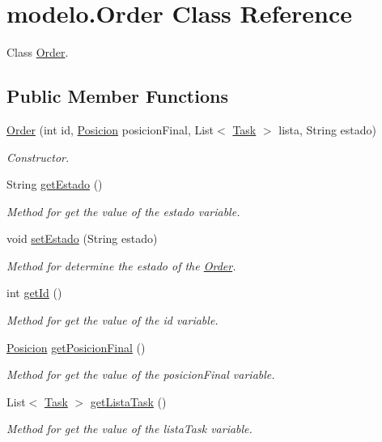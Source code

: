 \hypertarget{classmodelo_1_1_order}{}\section{modelo.\+Order Class Reference}
\label{classmodelo_1_1_order}


Class \mbox{\hyperlink{classmodelo_1_1_order}{Order}}.  


\subsection*{Public Member Functions}
\begin{DoxyCompactItemize}
\item 
\mbox{\hyperlink{classmodelo_1_1_order_a413d8d424a685bc7c454593c55494c51}{Order}} (int id, \mbox{\hyperlink{classmodelo_1_1_posicion}{Posicion}} posicion\+Final, List$<$ \mbox{\hyperlink{classmodelo_1_1_task}{Task}} $>$ lista, String estado)
\begin{DoxyCompactList}\small\item\em Constructor. \end{DoxyCompactList}\item 
String \mbox{\hyperlink{classmodelo_1_1_order_a022a04a9662463356a74e95b723d16fc}{get\+Estado}} ()
\begin{DoxyCompactList}\small\item\em Method for get the value of the estado variable. \end{DoxyCompactList}\item 
void \mbox{\hyperlink{classmodelo_1_1_order_ae01e30a69b5efd08f428f08a75756ca6}{set\+Estado}} (String estado)
\begin{DoxyCompactList}\small\item\em Method for determine the estado of the \mbox{\hyperlink{classmodelo_1_1_order}{Order}}. \end{DoxyCompactList}\item 
int \mbox{\hyperlink{classmodelo_1_1_order_a6eed9b98ef4db951d02fe77f8f1430b1}{get\+Id}} ()
\begin{DoxyCompactList}\small\item\em Method for get the value of the id variable. \end{DoxyCompactList}\item 
\mbox{\hyperlink{classmodelo_1_1_posicion}{Posicion}} \mbox{\hyperlink{classmodelo_1_1_order_a65b8d00aa11928a30bbe069540bb182f}{get\+Posicion\+Final}} ()
\begin{DoxyCompactList}\small\item\em Method for get the value of the posicion\+Final variable. \end{DoxyCompactList}\item 
List$<$ \mbox{\hyperlink{classmodelo_1_1_task}{Task}} $>$ \mbox{\hyperlink{classmodelo_1_1_order_a63df0012d498a6d188e54bae1a355d6e}{get\+Lista\+Task}} ()
\begin{DoxyCompactList}\small\item\em Method for get the value of the lista\+Task variable. \end{DoxyCompactList}\end{DoxyCompactItemize}



